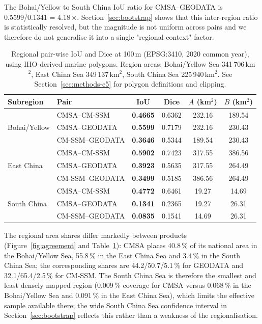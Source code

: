 \documentclass[11pt]{article}
\begin{document}
The Bohai/Yellow to South China IoU ratio for CMSA--GEODATA is
0.5599/0.1341 = 4.18\,$\times$. Section~\ref{sec:bootstrap} shows that this
inter-region ratio is statistically resolved, but the magnitude is not
uniform across pairs and we therefore do not generalise it into a single
"regional context" factor.

\begin{table}[htpb]
\centering
\caption{\label{tab:regional_iou}Regional pair-wise IoU and Dice at 100\,m
  (EPSG:3410, 2020 common year), using IHO-derived marine polygons.
  Region areas: Bohai/Yellow Sea 341\,706\,km$^2$, East China Sea
  349\,137\,km$^2$, South China Sea 225\,940\,km$^2$. See
  Section~\ref{sec:methods-e5} for polygon definitions and clipping.}
\begin{tabular}{l l c c c c}
\toprule
Subregion & Pair & IoU & Dice & $A$ (km$^2$) & $B$ (km$^2$) \\
\midrule
\multirow{3}{*}{Bohai/Yellow}
  & CMSA--CM-SSM & \textbf{0.4665} & 0.6362 & 232.16 & 189.54 \\
  & CMSA--GEODATA & \textbf{0.5599} & 0.7179 & 232.16 & 230.43 \\
  & CM-SSM--GEODATA & \textbf{0.3646} & 0.5344 & 189.54 & 230.43 \\
\midrule
\multirow{3}{*}{East China}
  & CMSA--CM-SSM & \textbf{0.5902} & 0.7423 & 317.55 & 386.56 \\
  & CMSA--GEODATA & \textbf{0.3923} & 0.5635 & 317.55 & 264.49 \\
  & CM-SSM--GEODATA & \textbf{0.3499} & 0.5185 & 386.56 & 264.49 \\
\midrule
\multirow{3}{*}{South China}
  & CMSA--CM-SSM & \textbf{0.4772} & 0.6461 & 19.27 & 14.69 \\
  & CMSA--GEODATA & \textbf{0.1341} & 0.2365 & 19.27 & 26.31 \\
  & CM-SSM--GEODATA & \textbf{0.0835} & 0.1541 & 14.69 & 26.31 \\
\bottomrule
\end{tabular}
\end{table}

The regional area shares differ markedly between products
(Figure~\ref{fig:agreement} and Table~\ref{tab:regional_iou}): CMSA places
40.8\,\% of its national area in the Bohai/Yellow Sea, 55.8\,\% in the East
China Sea and 3.4\,\% in the South China Sea; the corresponding shares are
44.2/50.7/5.1\,\% for GEODATA and 32.1/65.4/2.5\,\% for CM-SSM. The
South China Sea is therefore the smallest and least densely mapped region
(0.009\,\% coverage for CMSA versus 0.068\,\% in the Bohai/Yellow Sea and
0.091\,\% in the East China Sea), which limits the effective sample available
there; the wide South China Sea confidence interval in
Section~\ref{sec:bootstrap} reflects this rather than a weakness of the
regionalisation.
\end{document}
